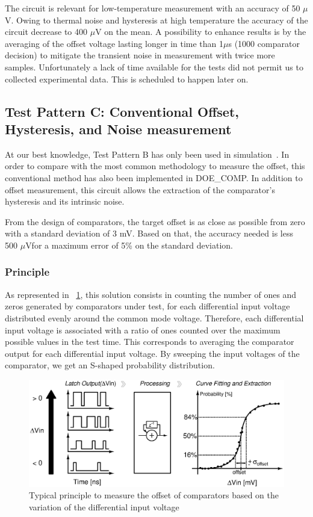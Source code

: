 The circuit is relevant for low-temperature measurement with an accuracy of 50 \(\mu\)V. Owing to thermal noise and hysteresis at high temperature the accuracy of the circuit decrease to 400 \(\mu\)V on the mean. A possibility to enhance results is by the averaging of the offset voltage lasting longer in time than 1\(\mu\)s (1000 comparator decision) to mitigate the transient noise in measurement with twice more samples. Unfortunately a lack of time available for the tests did not permit us to collected experimental data. This is scheduled to happen later on.

\subsection{Test Pattern C: Conventional Offset, Hysteresis, and Noise measurement}
At our best knowledge, Test Pattern B has only been used in simulation~\cite{1594475}. In order to compare with the most common methodology to measure the offset, this conventional method has also been implemented in DOE\_COMP. In addition to offset measurement, this circuit allows the extraction of the comparator's hysteresis and its intrinsic noise.

From the design of comparators, the target offset is as close as possible from zero with a standard deviation of 3 mV. Based on that, the accuracy needed is less 500 $\mu$V\footnotemark for a maximum error of 5\% on the standard deviation. 

\subsubsection{Principle}
As represented in \figurename~\ref{fig:conv_offset}, this solution consists in counting the number of ones and zeros generated by comparators under test, for each differential input voltage distributed evenly around the common mode voltage. Therefore, each differential input voltage is associated with a ratio of ones counted over the maximum possible values in the test time. This corresponds to averaging the comparator output for each differential input voltage. By sweeping the input voltages of the comparator, we get an S-shaped probability distribution.

\begin{figure}[htp]
    \centering
    \includegraphics[width=.8\textwidth]{Chapter5/Figs/comp_test/offset_conv_principle.ps}
    \caption{Typical principle to measure the offset of comparators based on the variation of the differential input voltage}
    \label{fig:conv_offset}
\end{figure}

